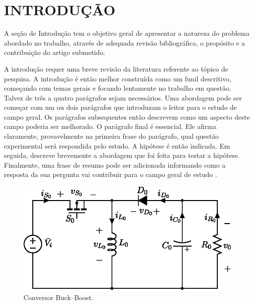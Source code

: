 %


\section{INTRODUÇÃO}


A seção de Introdução tem o objetivo geral de apresentar a natureza do problema abordado no trabalho, através de adequada revisão bibliográfica, o propósito e a contribuição do artigo submetido.

A introdução requer uma breve revisão da literatura referente ao tópico de pesquisa. A introdução é então melhor construída como um funil descritivo, começando com temas gerais e focando lentamente no trabalho em questão. Talvez de três a quatro parágrafos sejam necessários. Uma abordagem pode ser começar com um ou dois parágrafos que introduzam o leitor para o estudo de campo geral. Os parágrafos subsequentes então descrevem como um aspecto deste campo poderia ser melhorado. O parágrafo final é essencial. Ele afirma claramente, provavelmente na primeira frase do parágrafo, qual questão experimental será respondida pelo estudo. A hipótese é então indicada. Em seguida, descreve brevemente a abordagem que foi feita para testar a hipótese. Finalmente, uma frase de resumo pode ser adicionada informando como a resposta da sua pergunta vai contribuir para o campo geral de estudo .

\begin{figure}[!h]
	\centering
	\includegraphics[width=0.9\linewidth]{Figs/BuckBoostConv}
	\caption{Conversor Buck--Boost.}
	\label{fig:buckboost}
\end{figure}

